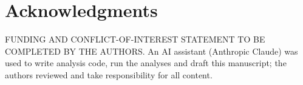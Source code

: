 \documentclass{article}
\begin{document}
\section{Acknowledgments}
\label{sec:acknowledgments}
FUNDING AND CONFLICT-OF-INTEREST STATEMENT TO BE COMPLETED BY THE AUTHORS. An AI assistant (Anthropic Claude) was used to write analysis code, run the analyses and draft this manuscript; the authors reviewed and take responsibility for all content.



\end{document}
